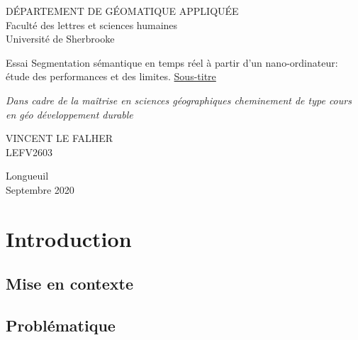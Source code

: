 \documentclass[12pt, letterpaper]{article}
\begin{document}
\begin{titlepage} %
   \centering %
 
   \scshape %
  
   DÉPARTEMENT DE GÉOMATIQUE APPLIQUÉE\\Faculté des lettres et sciences humaines\\Université de Sherbrooke
   
   \vspace{10\baselineskip}
 
   {\LARGE Essai}
   \vspace{1\baselineskip}
   \linebreak
   {\LARGE Segmentation sémantique en temps réel à partir d'un nano-ordinateur: étude des performances et des limites.}
   \vspace{1\baselineskip}
   \linebreak
   \underline{{\LARGE Sous-titre}}
 
   \vspace*{3\baselineskip}
 
   \textit{Dans cadre de la maîtrise en sciences géographiques cheminement de type cours en géo développement durable}
   
   \vspace{5\baselineskip}
    
   VINCENT LE FALHER\\LEFV2603
     
   \vfill %
 
   Longueuil\\Septembre 2020 %
 
\end{titlepage}
\thispagestyle{empty}
\tableofcontents{}
\listoffigures{}
\listoftables{}
\newpage
{}

\section{Introduction}
\subsection{Mise en contexte}

\subsection{Problématique}

\end{document}
